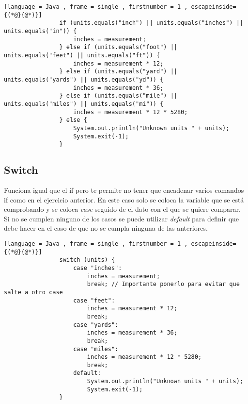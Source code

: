 \documentclass[11pt]{article}
\theoremstyle{plain}
\begin{document}
            \begin{lstlisting}[language = Java , frame = single , firstnumber = 1 , escapeinside={(*@}{@*)}]
                if (units.equals("inch") || units.equals("inches") || units.equals("in")) {
                    inches = measurement;
                } else if (units.equals("foot") || units.equals("feet") || units.equals("ft")) {
                    inches = measurement * 12;
                } else if (units.equals("yard") || units.equals("yards") || units.equals("yd")) {
                    inches = measurement * 36;
                } else if (units.equals("mile") || units.equals("miles") || units.equals("mi")) {
                    inches = measurement * 12 * 5280;
                } else {
                    System.out.println("Unknown units " + units);
                    System.exit(-1);
                }
            \end{lstlisting}
        \subsection{Switch} %
        \label{sub:switch}
            Funciona igual que el if pero te permite no tener que encadenar varios comandos if como en el ejercicio anterior. En este caso solo se coloca la variable que se está comprobando y se coloca \textit{case} seguido de el dato con el que se quiere comparar. Si no se cumplen ninguno de los casos se puede utilizar \textit{default} para definir que debe hacer en el caso de que no se cumpla ninguna de las anteriores.
            \begin{lstlisting}[language = Java , frame = single , firstnumber = 1 , escapeinside={(*@}{@*)}]
                switch (units) {
                    case "inches":
                        inches = measurement;
                        break; // Importante ponerlo para evitar que salte a otro case
                    case "feet":
                        inches = measurement * 12;
                        break;
                    case "yards":
                        inches = measurement * 36;
                        break;
                    case "miles":
                        inches = measurement * 12 * 5280;
                        break;
                    default:
                        System.out.println("Unknown units " + units);
                        System.exit(-1);
                }
            \end{lstlisting}
\end{document}
